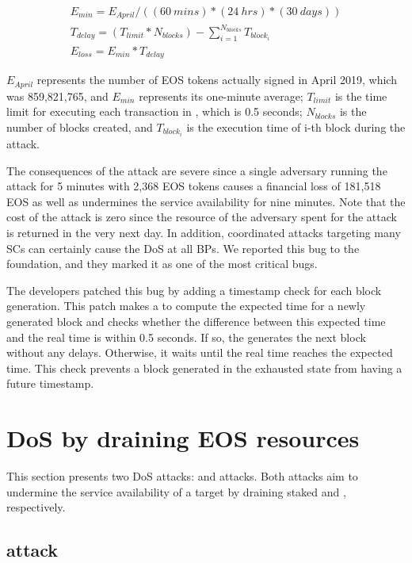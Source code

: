 \begin{equation*}
\begin{gathered}
    E_{min} = E_{April} / ((60\ mins)*(24\ hrs)*(30\ days))
    \\
    T_{delay} = (T_{limit}*N_{blocks})-\sum_{i=1}^{N_{blocks}} T_{block_{i}}
    \\
    E_{loss} = E_{min} * T_{delay}
\end{gathered}
\end{equation*}

$E_{April}$ represents the number of EOS tokens actually signed in April 2019,
which was 859,821,765, and $E_{min}$ represents its one-minute average;
$T_{limit}$ is the time limit for executing each transaction in \eos, which is
0.5 seconds; $N_{blocks}$ is the number of blocks created, and $T_{block_{i}}$
is the execution time of i-th block during the attack.

The consequences of the attack are severe since a single adversary running the
attack for 5 minutes with 2,368 EOS tokens causes a financial loss of
181,518 EOS as well as undermines the service availability for nine
minutes.
%
Note that the cost of the attack is zero since the resource of the adversary
spent for the attack is returned in the very next day. In addition, coordinated
attacks targeting many SCs can certainly cause the DoS at all BPs. We reported
this bug to the \PLATFORM foundation, and they marked it as one of the most
critical bugs.

The \eos developers patched this bug by adding a timestamp check for each \eos
block generation. This patch makes a \BP to compute the expected time for a
newly generated block and checks whether the difference between this expected
time and the real time is within 0.5 seconds. If so, the \BP generates the next
block without any delays. Otherwise, it waits until the real time reaches the
expected time. This check prevents a block generated in the exhausted state from
having a future timestamp.






\section{DoS by draining EOS resources}
This section presents two DoS attacks: \TESER and \SCPDOS attacks. Both attacks
aim to undermine the service availability of a target \SCP by draining staked
\cpu and \ram, respectively.

\subsection{\TESER attack}
\label{label_teser}


